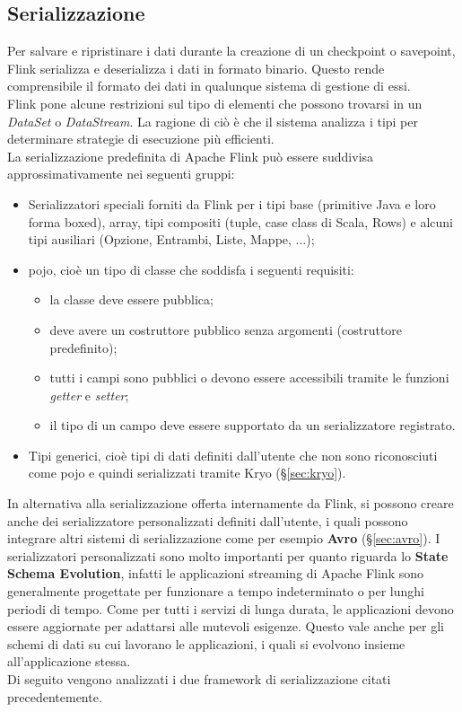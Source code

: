 {\subsection{Serializzazione}
Per salvare e ripristinare i dati durante la creazione di un checkpoint o savepoint, Flink serializza e deserializza i dati in formato binario. Questo rende comprensibile il formato dei dati in qualunque sistema di gestione di essi.\\
Flink pone alcune restrizioni sul tipo di elementi che possono trovarsi in un \textit{DataSet} o \textit{DataStream}. La ragione di ciò è che il sistema analizza i tipi per determinare strategie di esecuzione più efficienti.\\
La serializzazione predefinita di Apache Flink può essere suddivisa approssimativamente nei seguenti gruppi:

\begin{itemize}
	\item{
Serializzatori speciali forniti da Flink per i tipi base (primitive Java e loro forma boxed), array, tipi compositi (tuple, case class di Scala, Rows) e alcuni tipi ausiliari (Opzione, Entrambi, Liste, Mappe, ...);}
	\item{\gls{pojo}, cioè un tipo di classe che soddisfa i seguenti requisiti:
\begin{itemize}
	\item{la classe deve essere pubblica;}
	\item{deve avere un costruttore pubblico senza argomenti (costruttore predefinito);}
	\item{tutti i campi sono pubblici o devono essere accessibili tramite le funzioni \textit{getter} e \textit{setter};}
	\item{il tipo di un campo deve essere supportato da un serializzatore registrato.}
\end{itemize}}
	\item{Tipi generici, cioè tipi di dati definiti dall'utente che non sono riconosciuti come \gls{pojo} e quindi serializzati tramite Kryo (\S\ref{sec:kryo}).}
\end{itemize}
In alternativa alla serializzazione offerta internamente da Flink, si possono creare anche dei serializzatore personalizzati definiti dall'utente, i quali possono integrare altri sistemi di serializzazione come per esempio \textbf{Avro} (\S\ref{sec:avro}). I serializzatori personalizzati sono molto importanti per quanto riguarda lo \textbf{State Schema Evolution}, infatti le applicazioni streaming di Apache Flink sono generalmente progettate per funzionare a tempo indeterminato o per lunghi periodi di tempo. Come per tutti i servizi di lunga durata, le applicazioni devono essere aggiornate per adattarsi alle mutevoli esigenze. Questo vale anche per gli schemi di dati su cui lavorano le applicazioni, i quali si evolvono insieme all'applicazione stessa.\\
Di seguito vengono analizzati i due \gls{framework} di serializzazione citati precedentemente.

}
